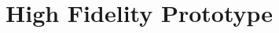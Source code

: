\documentclass[prototype.tex]{subfiles}
\begin{document}
\section{High Fidelity Prototype} %
\label{sec:high_fidelity_prototype}

\end{document}
